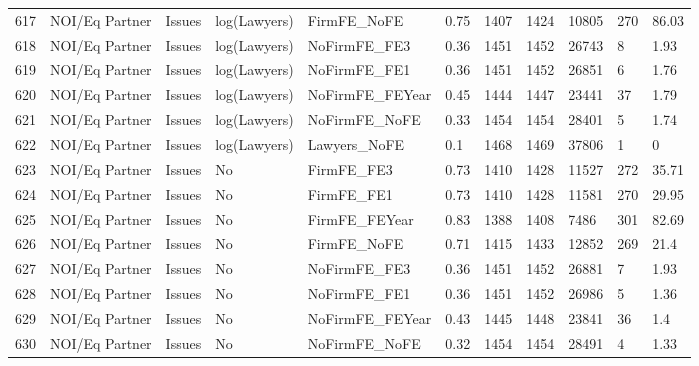 \begin{table}[ht]
\begin{tabular}{rllllllllll}
  617 & NOI/Eq Partner & Issues & log(Lawyers) & FirmFE\_NoFE & 0.75 & 1407 & 1424 & 10805 & 270 & 86.03 \\ 
  618 & NOI/Eq Partner & Issues & log(Lawyers) & NoFirmFE\_FE3 & 0.36 & 1451 & 1452 & 26743 & 8 & 1.93 \\ 
  619 & NOI/Eq Partner & Issues & log(Lawyers) & NoFirmFE\_FE1 & 0.36 & 1451 & 1452 & 26851 & 6 & 1.76 \\ 
  620 & NOI/Eq Partner & Issues & log(Lawyers) & NoFirmFE\_FEYear & 0.45 & 1444 & 1447 & 23441 & 37 & 1.79 \\ 
  621 & NOI/Eq Partner & Issues & log(Lawyers) & NoFirmFE\_NoFE & 0.33 & 1454 & 1454 & 28401 & 5 & 1.74 \\ 
  622 & NOI/Eq Partner & Issues & log(Lawyers) & Lawyers\_NoFE & 0.1 & 1468 & 1469 & 37806 & 1 & 0 \\ 
  623 & NOI/Eq Partner & Issues & No & FirmFE\_FE3 & 0.73 & 1410 & 1428 & 11527 & 272 & 35.71 \\ 
  624 & NOI/Eq Partner & Issues & No & FirmFE\_FE1 & 0.73 & 1410 & 1428 & 11581 & 270 & 29.95 \\ 
  625 & NOI/Eq Partner & Issues & No & FirmFE\_FEYear & 0.83 & 1388 & 1408 & 7486 & 301 & 82.69 \\ 
  626 & NOI/Eq Partner & Issues & No & FirmFE\_NoFE & 0.71 & 1415 & 1433 & 12852 & 269 & 21.4 \\ 
  627 & NOI/Eq Partner & Issues & No & NoFirmFE\_FE3 & 0.36 & 1451 & 1452 & 26881 & 7 & 1.93 \\ 
  628 & NOI/Eq Partner & Issues & No & NoFirmFE\_FE1 & 0.36 & 1451 & 1452 & 26986 & 5 & 1.36 \\ 
  629 & NOI/Eq Partner & Issues & No & NoFirmFE\_FEYear & 0.43 & 1445 & 1448 & 23841 & 36 & 1.4 \\ 
  630 & NOI/Eq Partner & Issues & No & NoFirmFE\_NoFE & 0.32 & 1454 & 1454 & 28491 & 4 & 1.33 \\ 
   \hline
\end{tabular}
\end{table}
